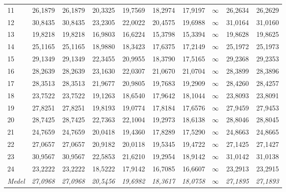 \begin{table}[H]
{\begin{tabular}{lrrrrrrrrr}
11 & 26{,}1879 & 26{,}1879 & 20{,}3325 & 19{,}7569 & 18{,}2974 & 17{,}9197 & $\infty$ & 26{,}2634 & 26{,}2629 \\
12 & 30{,}8435 & 30{,}8435 & 23{,}2305 & 22{,}0022 & 20{,}4575 & 19{,}6988 & $\infty$ & 31{,}0164 & 31{,}0160 \\
13 & 19{,}8218 & 19{,}8218 & 16{,}9803 & 16{,}6224 & 15{,}3798 & 15{,}3394 & $\infty$ & 19{,}8628 & 19{,}8625 \\
14 & 25{,}1165 & 25{,}1165 & 18{,}9880 & 18{,}3423 & 17{,}6375 & 17{,}2149 & $\infty$ & 25{,}1972 & 25{,}1973 \\
15 & 29{,}1349 & 29{,}1349 & 22{,}3455 & 20{,}9955 & 18{,}3790 & 17{,}5165 & $\infty$ & 29{,}2368 & 29{,}2353 \\
16 & 28{,}2639 & 28{,}2639 & 23{,}1630 & 22{,}0307 & 21{,}0670 & 21{,}0704 & $\infty$ & 28{,}3899 & 28{,}3896 \\
17 & 28{,}3513 & 28{,}3513 & 21{,}9677 & 20{,}9805 & 19{,}7683 & 19{,}2909 & $\infty$ & 28{,}4260 & 28{,}4257 \\
18 & 23{,}7522 & 23{,}7522 & 19{,}1263 & 18{,}6540 & 17{,}9642 & 18{,}1044 & $\infty$ & 23{,}8093 & 23{,}8091 \\
19 & 27{,}8251 & 27{,}8251 & 19{,}8193 & 19{,}0774 & 17{,}8184 & 17{,}6576 & $\infty$ & 27{,}9459 & 27{,}9453 \\
20 & 28{,}7425 & 28{,}7425 & 22{,}7363 & 22{,}1004 & 19{,}2973 & 18{,}6138 & $\infty$ & 28{,}8046 & 28{,}8045 \\
21 & 24{,}7659 & 24{,}7659 & 20{,}0418 & 19{,}4360 & 17{,}8289 & 17{,}5290 & $\infty$ & 24{,}8663 & 24{,}8665 \\
22 & 27{,}0657 & 27{,}0657 & 20{,}9182 & 20{,}0118 & 19{,}5345 & 19{,}4722 & $\infty$ & 27{,}1425 & 27{,}1427 \\
23 & 30{,}9567 & 30{,}9567 & 22{,}5853 & 21{,}6210 & 19{,}2954 & 18{,}9142 & $\infty$ & 31{,}0142 & 31{,}0138 \\
24 & 23{,}2222 & 23{,}2222 & 18{,}5222 & 17{,}9142 & 16{,}7085 & 16{,}6607 & $\infty$ & 23{,}2913 & 23{,}2915 \\
\hline
\textit{Medel} & \textit{27{,}0968} & \textit{27{,}0968} & \textit{20{,}5456} & \textit{19{,}6982} & \textit{18{,}3617} & \textit{18{,}0758} & \textit{$\infty$} & \textit{27{,}1895} & \textit{27{,}1893} \\
\hline
\end{tabular}
}
\end{table}



